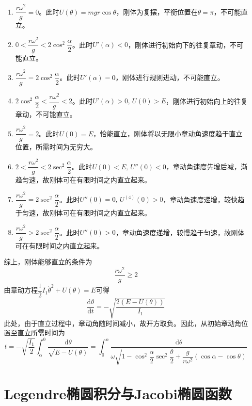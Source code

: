 \begin{solution}
\begin{enumerate}
	\item $\dfrac{r\omega^2}{g} = 0$。此时$U(\theta) = mgr\cos \theta$，刚体为复摆，平衡位置在$\theta = \pi$，不可能直立。
	\item $0 < \dfrac{r\omega^2}{g} < 2\cos^2 \dfrac{\alpha}{2}$。此时$U'(\alpha)<0$，刚体进行初始向下的往复章动，不可能直立。
	\item $\dfrac{r\omega^2}{g} = 2\cos^2 \dfrac{\alpha}{2}$。此时$U'(\alpha) = 0$，刚体进行规则进动，不可能直立。
	\item $2\cos^2 \dfrac{\alpha}{2} < \dfrac{r\omega^2}{g} < 2$。此时$U'(\alpha) > 0,\,U(0) > E$，刚体进行初始向上的往复章动，不可能直立。
	\item $\dfrac{r\omega^2}{g} = 2$。此时$U(0) = E$，恰能直立，刚体将以无限小章动角速度趋于直立位置，所需时间为无穷大。
	\item $2 < \dfrac{r\omega^2}{g} < 2\sec^2 \dfrac{\alpha}{2}$。此时$U(0)<E,\,U''(0)<0$，章动角速度先增后减，渐趋匀速，故刚体可在有限时间之内直立起来。
	\item $\dfrac{r\omega^2}{g} = 2\sec^2 \dfrac{\alpha}{2}$。此时$U''(0) = 0,\,U^{(4)}(0) > 0$，章动角速度递增，较快趋于匀速，故刚体可在有限时间之内直立起来。
	\item $\dfrac{r\omega^2}{g} > 2\sec^2 \dfrac{\alpha}{2}$。此时$U''(0) > 0$，章动角速度递增，较慢趋于匀速，故刚体可在有限时间之内直立起来。
\end{enumerate}
综上，刚体能够直立的条件为
\begin{equation*}
	\frac{r\omega^2}{g} \geqslant 2
\end{equation*}
由章动方程$\dfrac12 I_1 \dot{\theta}^2 + U(\theta) = E$可得
\begin{equation*}
	\frac{\mathrm{d} \theta}{\mathrm{d} t} = -\sqrt{\frac{2(E-U(\theta))}{I_1}}
\end{equation*}
此处，由于直立过程中，章动角随时间减小，故开方取负。因此，从初始章动角位置至直立所需时间为
\begin{equation*}
	t = -\sqrt{\frac{I_1}{2}} \int_\alpha^0 \frac{\mathrm{d} \theta}{\sqrt{E-U(\theta)}} = \int_0^\alpha \frac{\mathrm{d} \theta}{\omega\sqrt{1 - \cos^2 \dfrac{\alpha}{2} \sec^2 \dfrac{\theta}{2} + \dfrac{g}{r\omega^2}(\cos \alpha-\cos \theta)}}
\end{equation*}
\end{solution}

\section{Legendre椭圆积分与Jacobi椭圆函数}\label{椭圆积分与Jacobi椭圆函数}


